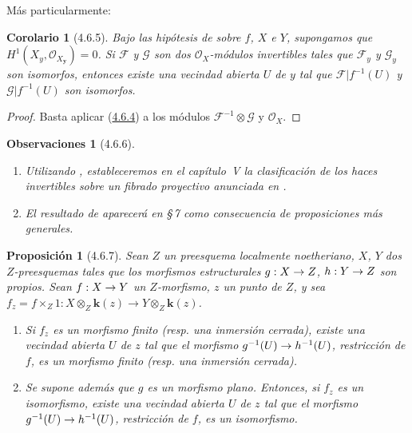 \documentclass[10pt,oneside,openany]{book}
\theoremstyle{egaenv}\newtheorem*{env}{---}
\theoremstyle{egastatement}
\newtheorem*{proposition}{Proposición}
\newtheorem*{corollary}{Corolario}
\theoremstyle{egadescription}
\newtheorem*{remarks}{Observaciones}
\renewcommand{\to}{\mathchoice{\longrightarrow}{\rightarrow}{\rightarrow}{\rightarrow}}
\begin{document}
Más particularmente:

\begin{corollary}[4.6.5]
\label{III.4.6.5}
\label{III.4.6.5-fr}
Bajo las hipótesis de  sobre $f$, $X$ e $Y$,
supongamos que
$H^1(X_y,\mathcal O_{X_{\boldsymbol{y}}})=0$.
Si $\mathcal F$ y $\mathcal G$ son dos $\mathcal O_X$-módulos invertibles tales
que $\mathcal F_y$ y $\mathcal G_y$ son isomorfos, entonces existe una vecindad
abierta $U$ de $y$
tal que $\mathcal F|f^{-1}(U)$ y $\mathcal G|f^{-1}(U)$ son isomorfos.
\end{corollary}

\begin{proof}
Basta aplicar (\hyperref[III.4.6.4-fr]{4.6.4}) a los módulos
$\mathcal F^{-1}\otimes\mathcal G$ y $\mathcal O_X$.
\end{proof}

\begin{remarks}[4.6.6]
\label{III.4.6.6}
\label{III.4.6.6-fr}
\begin{enumerate}
\item[(i)] Utilizando , estableceremos en el capítulo~V
  la clasificación de los haces invertibles sobre un fibrado proyectivo
  anunciada en .
\item[(ii)] El resultado de  aparecerá en \S\,7 como
  consecuencia de proposiciones más generales.
\end{enumerate}
\end{remarks}

\begin{proposition}[4.6.7]
\label{III.4.6.7-fr}
Sean $Z$ un preesquema localmente noetheriano, $X$, $Y$ dos $Z$-preesquemas
tales que los morfismos estructurales $g:X\to Z$, $h:Y\to Z$ son propios.
Sean $f:X\to Y$ un $Z$-morfismo, $z$ un punto de $Z$, y sea
$f_z=f\times_Z1:
X\otimes_Z\boldsymbol{k}(z)\longrightarrow Y\otimes_Z\boldsymbol{k}(z)$.
\begin{enumerate}
\item[\textup{(i)}] Si $f_z$ es un morfismo finito \textup{(resp.} una inmersión cerrada),
existe una vecindad abierta $U$ de $z$ tal que el morfismo
$g^{-1}(U)\to h^{-1}(U)$, restricción de $f$, es un morfismo finito \textup{(resp.}
una inmersión cerrada).
\item[\textup{(ii)}] Se supone además que $g$ es un morfismo plano. Entonces, si
$f_z$ es un isomorfismo, existe una vecindad abierta $U$ de $z$ tal que
el morfismo $g^{-1}(U)\to h^{-1}(U)$, restricción de $f$, es un
isomorfismo.
\end{enumerate}
\end{proposition}
\end{document}
